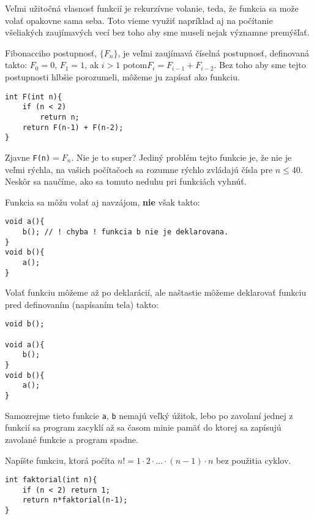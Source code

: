 \medskip

Veľmi užitočná vlasnosť funkcií je rekurzívne volanie, teda, že funkcia sa može
volať opakovne sama seba. Toto vieme využiť napríklad aj na počítanie
všeliakých zaujímavých vecí bez toho aby sme museli nejak významne
premýšľať.

Fibonacciho postupnosť, $\{F_n\}$,  je veľmi zaujímavá číselná postupnosť,
definovaná takto: $F_0 = 0$, $F_1 = 1$, ak $i>1$ potom$F_i = F_{i-1} +
F_{i-2}$.  Bez toho aby sme tejto postupnosti hlbšie porozumeli, môžeme ju
zapísať ako funkciu.

\begin{lstlisting}
int F(int n){
    if (n < 2)
        return n;
    return F(n-1) + F(n-2);
}
\end{lstlisting}

Zjavne \verb!F(n)!$ = F_n$. Nie je to super? Jediný problém tejto funkcie je,
že nie je veľmi rýchla, na vašich počítačoch sa rozumne rýchlo zvládajú čísla
pre $n \leq 40$. Neskôr sa naučíme, ako sa tomuto neduhu pri funkciách vyhnúť.

\medskip

Funkcia sa môžu volať aj navzájom, \textbf{nie} však takto:
\begin{lstlisting}
void a(){
    b(); // ! chyba ! funkcia b nie je deklarovana.
}
void b(){
    a();
}
\end{lstlisting}

Volať funkciu môžeme až po deklarácií, ale naštastie môžeme deklarovať
funkciu pred definovaním (napísaním tela) takto:

\begin{lstlisting}
void b();

void a(){
    b();
}
void b(){
    a();
}
\end{lstlisting}

Samozrejme tieto funkcie \verb!a!, \verb!b! nemajú veľký úžitok, lebo po
zavolaní jednej z funkcií sa program zacyklí až sa časom minie pamäť do ktorej
sa zapísujú zavolané funkcie a program spadne.

\cvicenie Napíšte funkciu, ktorá počíta $n! = 1\cdot 2\cdot\dots\cdot
(n-1)\cdot n$ bez použitia cyklov.

\riesenie 
{}\begin{lstlisting}
int faktorial(int n){
    if (n < 2) return 1;
    return n*faktorial(n-1);
}
\end{lstlisting}


